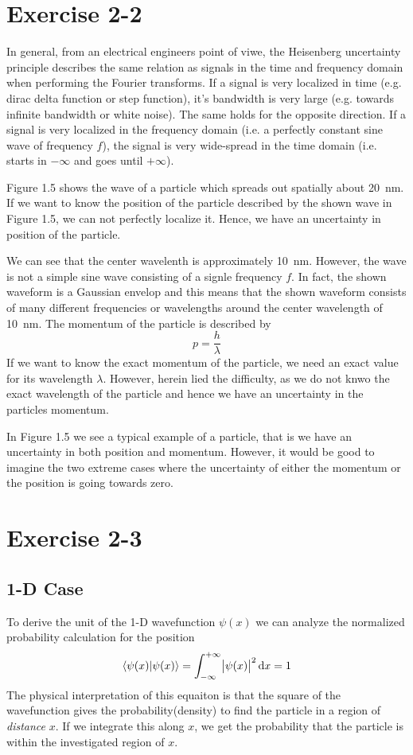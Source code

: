 \section{Exercise 2-2}
In general, from an electrical engineers point of viwe, the Heisenberg
uncertainty principle describes the same relation as signals in the time and
frequency domain when performing the Fourier transforms. If a signal is very
localized in time (e.g. dirac delta function or step function), it's
bandwidth is very large (e.g. towards infinite bandwidth or white noise).
The same holds for the opposite direction. If a signal is very localized in
the frequency domain (i.e. a perfectly constant sine wave of frequency $f$),
the signal is very wide-spread in the time domain (i.e. starts in
$-\infty$ and goes until $+\infty$).

Figure 1.5 shows the wave of a particle which spreads out spatially about
\SI{20}{\nano\meter}. If we want to know the position of the particle
described by the shown wave in Figure 1.5, we can not perfectly localize
it. Hence, we have an uncertainty in position of the particle.

We can see that the center wavelenth is approximately \SI{10}{\nano\meter}.
However, the wave is not a simple sine wave consisting of a signle frequency
$f$. In fact, the shown waveform is a Gaussian envelop and this means that
the shown waveform consists of many different frequencies or wavelengths
around the center wavelength of \SI{10}{\nano\meter}. The momentum of the
particle is described by
\[
	p = \frac{h}{\lambda}
\]
If we want to know the exact momentum of the particle, we need an exact
value for its wavelength $\lambda$. However, herein lied the difficulty,
as we do not knwo the exact wavelength of the particle and hence we
have an uncertainty in the particles momentum.

In Figure 1.5 we see a typical example of a particle, that is we have an
uncertainty in both position and momentum. However, it would be good to
imagine the two extreme cases where the uncertainty of either the momentum
or the position is going towards zero.

\section{Exercise 2-3}

\subsection{1-D Case}
To derive the unit of the 1-D wavefunction $\psi(x)$ we can analyze the
normalized probability calculation for the position
\[
	\braket{\psi(x)|\psi(x)}
	= \int_{-\infty}^{+\infty}{\abs{\psi(x)}^2} \dif x
	= 1
\]
The physical interpretation of this equaiton is that the square of the 
wavefunction gives the probability(density) to find the particle in a
region of \emph{distance} $x$. If we integrate this along $x$, we get
the probability that the particle is within the investigated region of $x$.

